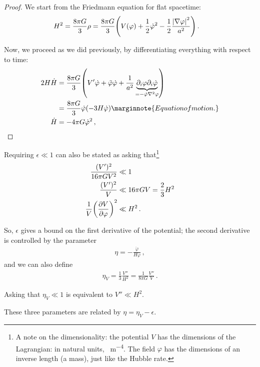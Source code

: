 \documentclass[main.tex]{subfiles}
\begin{document}
\begin{proof}

We start from the Friedmann equation for flat spacetime: 
%
\begin{align}
H^2 &= \frac{8 \pi G}{3} \rho = \frac{8 \pi G}{3} \qty(V(\varphi ) + \frac{1}{2} \dot{\varphi}^2 - \frac{1}{2} \frac{\abs{\nabla\varphi}^2}{a^2} ) 
\,.
\end{align}

Now, we proceed as we did previously, by differentiating everything with respect to time: 
%
\begin{align}
2 H \dot{H} &= \frac{8 \pi G}{3} \qty( V' \dot{\varphi} + \ddot{\varphi} \dot{\varphi} + \frac{1}{a^2} \underbrace{\partial_{i} \varphi \partial_{i} \dot{\varphi}}_{= -\dot{\varphi} \nabla^2 \varphi })  \\
&= \frac{8 \pi G}{3} \dot{\varphi} \qty(- 3 H \dot{\varphi}) \marginnote{Equation of motion.}  \\
\dot{H} &= - 4 \pi G \dot{\varphi}^2
\,,
\end{align}
\end{proof}


Requiring \(\epsilon \ll 1\) can also be stated as asking that\footnote{A note on the dimensionality: the potential \(V\) has the dimensions of the Lagrangian: in natural units, \SI{}{m^{-4}}. The field \(\varphi \) has the dimensions of an inverse length (a mass), just like the Hubble rate.}
%
\begin{align}
\frac{(V')^2}{16 \pi G V^2} &\ll 1  \\
\frac{(V')^2}{V} &\ll 16 \pi G V = \frac{2}{3} H^2 \\ 
\frac{1}{V} \qty(\pdv{V}{\varphi })^2 &\ll H^2
\,.
\end{align}

So, \(\epsilon \) gives a bound on the first derivative of the potential; the second derivative is controlled by the parameter 
%
\begin{align}
\eta = - \frac{\ddot{\varphi}}{H \dot{\varphi}
}
\,,
\end{align}
%
and we can also define 
%
\begin{align}
\eta _V = \frac{1}{3} \frac{V''}{H^2} = \frac{1}{8 \pi G} \frac{V''}{V}
\,.
\end{align}

Asking that \(\eta _V \ll 1 \) is equivalent to \(V'' \ll H^2\). 

\begin{claim}
These three parameters are related by \(\eta = \eta _V - \epsilon \).
\end{claim}
\end{document}
